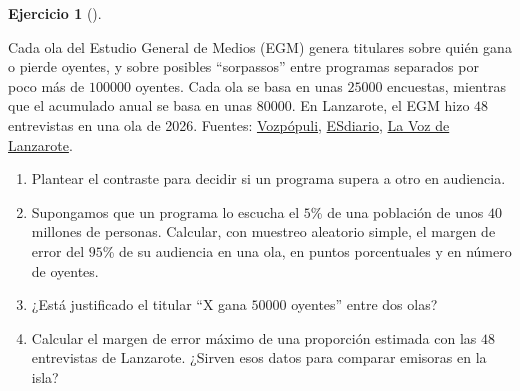 \documentclass[
  spanish,
  a4paper,
]{scrreport}
\theoremstyle{definition}
\newtheorem{exercise}{Ejercicio}[chapter]
\theoremstyle{remark}
\begin{document}
\begin{exercise}[]\protect\hypertarget{exr-interpretacion-egm}{}\label{exr-interpretacion-egm}

Cada ola del Estudio General de Medios (EGM) genera titulares sobre
quién gana o pierde oyentes, y sobre posibles ``sorpassos'' entre
programas separados por poco más de \(100000\) oyentes. Cada ola se basa
en unas \(25000\) encuestas, mientras que el acumulado anual se basa en
unas \(80000\). En Lanzarote, el EGM hizo \(48\) entrevistas en una ola
de 2026. Fuentes:
\href{https://www.vozpopuli.com/espana/grandes-comunicadores-radio-mejor-audiencia-historica.html}{Vozpópuli},
\href{https://www.esdiario.com/chismografo/medios/240424/132393/alarma-ser-aimar-bretos-cope.html}{ESdiario},
\href{https://www.lavozdelanzarote.com/en/ekonomus/eko/the-joke-of-the-egm-in-lanzarote-is-accentuated_242821_102.html}{La
Voz de Lanzarote}.

\begin{enumerate}
\def\labelenumi{\alph{enumi}.}
\item
  Plantear el contraste para decidir si un programa supera a otro en
  audiencia.
\item
  Supongamos que un programa lo escucha el \(5\)\% de una población de
  unos \(40\) millones de personas. Calcular, con muestreo aleatorio
  simple, el margen de error del \(95\)\% de su audiencia en una ola, en
  puntos porcentuales y en número de oyentes.
\item
  ¿Está justificado el titular ``X gana \(50000\) oyentes'' entre dos
  olas?
\item
  Calcular el margen de error máximo de una proporción estimada con las
  \(48\) entrevistas de Lanzarote. ¿Sirven esos datos para comparar
  emisoras en la isla?
\end{enumerate}

\end{exercise}
\end{document}
